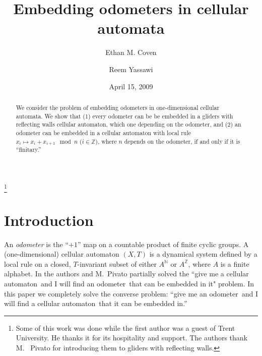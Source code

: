 \documentclass[12pt]{amsart}
\begin{document}
\newtheorem*{Th2}{Theorem 2}
\newtheorem*{Th2A}{Theorem 2A}
\newtheorem*{Th2B}{Theorem 2B}
\newtheorem*{theorem}{Theorem}
\newtheorem*{Th1}{Theorem 1}
\newtheorem*{remark}{Remark}
\newtheorem{lemma}{Lemma}

 

\title {Embedding odometers in  cellular automata}

\author{Ethan M. Coven}
\address{Department of Mathematics, Wesleyan University, Middletown CT 06457-0128}

\author{Reem Yassawi}
\address{Department of Mathematics,
Trent University,
Peterborough ON, Canada K9L 1Z8}

\thanks{Some of this work was done while the first author was a guest of Trent University.  He thanks it for its hospitality and support.  The authors thank M.~ Pivato for  introducing them to gliders with reflecting walls.}




\date{April 15, 2009}

\begin{abstract}
We consider the problem of embedding odometers 
in one-dimensional 
cellular automata. We show that
(1) every odometer can be be embedded in  a  gliders with reflecting walls cellular automaton, which one depending on the odometer, and
(2) an odometer can be embedded in a cellular automaton with local rule  
$x_i \mapsto x_i + x_{i+1}  \mod n$  ($i \in \mathbb Z$), where  $n$  depends on the odometer, if and only if it is  ``finitary.''

\end{abstract}

\maketitle

\section*{Introduction}

An \emph{odometer\/} is the ``$+1$'' map on a countable product of finite cyclic groups.  A (one-dimensional) {{cellular automaton}\/} $(X,T)$ is a dynamical system defined by a local rule on a closed, $T$-invariant subset of either $A^{\mathbb N}$ or $A^{\mathbb Z}$,
where $A$ is a finite alphabet.
In \cite{CPY} the authors and M.~Pivato
partially solved the ``give me a {cellular automaton}\ and I will find an {odometer}\ that can be embedded in it" problem.  In this paper we 
completely
solve the converse problem: ``give me an {odometer}\ and I will find a {cellular automaton}\ that it can be embedded in.''  
\end{document}
